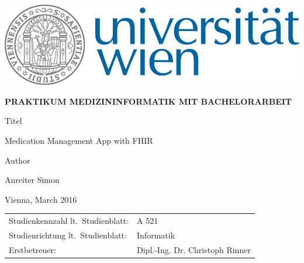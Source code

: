 \begin{titlepage}
\vspace*{-2cm}  %
\begin{flushright}
    \includegraphics{UNI-Logo_RGB_01}
\end{flushright}
\vspace{1cm}

\begin{center}  %
    \Large{\textbf{\textsf{\MakeUppercase{
        Praktikum Medizininformatik mit Bachelorarbeit
    }}}}
    \vspace{2cm}

    \large{\textsf{
        Titel
    }}
    \vspace{.1cm}

    \Large{\textsf{
        Medication Management App with FHIR
    }}
    \vspace{3cm}

    \large{\textsf{
        Author
    }}

    \Large{\textsf{
        Anreiter Simon
    }}
    \vspace{3cm}

\end{center}
\vspace{2cm}

\noindent\textsf{Vienna, March 2016}  %
\vfill

\noindent\begin{tabular}{@{}ll}
\textsf{Studienkennzahl lt.\ Studienblatt:}
&
\textsf{A 521}  %
\\
\textsf{Studienrichtung lt.\ Studienblatt:}
&
\textsf{Informatik}  %
\\
\textsf{Erstbetreuer:}
&
\textsf{Dipl.-Ing. Dr. Christoph Rinner}  %

\end{tabular}

\end{titlepage}
